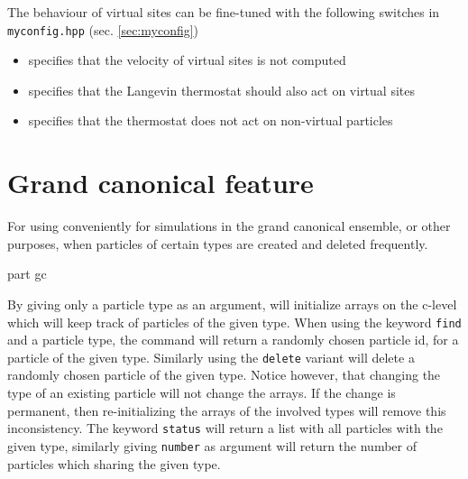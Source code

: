 The behaviour of virtual sites can be fine-tuned with the following
switches in \texttt{myconfig.hpp} (sec. \ref{sec:myconfig})
\begin{itemize}
\item {} specifies that the velocity
  of virtual sites is not computed
\item {} specifies that the Langevin
  thermostat should also act on virtual sites
\item {} specifies that the
  thermostat does not act on non-virtual particles
\end{itemize}

\section{Grand canonical feature}
For using \es conveniently for simulations in the grand canonical ensemble, or
other purposes, when particles of certain types are created and deleted frequently.

\begin{essyntax}
part gc
\begin{features}
\end{features}

\end{essyntax}
By giving only a particle type as an argument, \es will initialize
arrays on the c-level which will keep track of particles of the given
type. When using the keyword \texttt{find} and a particle type, the
command will return a randomly chosen particle id, for a particle of
the given type. Similarly using the \texttt{delete} variant will
delete a randomly chosen particle of the given type.  Notice however,
that changing the type of an existing particle will not change the
arrays. If the change is permanent, then re-initializing the arrays of
the involved types will remove this inconsistency.  The keyword
\texttt{status} will return a list with all particles with the given
type, similarly giving \texttt{number} as argument will return the
number of particles which sharing the given type.

